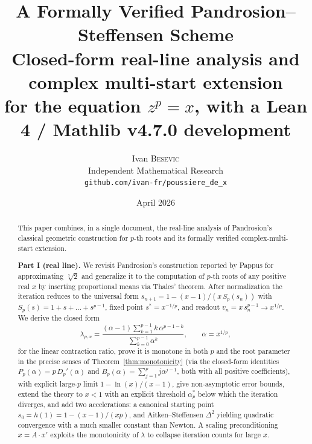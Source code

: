\documentclass[11pt,a4paper]{article}
\title{\textbf{A Formally Verified Pandrosion--Steffensen Scheme}\\[0.3em]
  \large Closed-form real-line analysis and complex multi-start extension\\
  for the equation $z^p = x$, with a Lean 4 / Mathlib v4.7.0 development}
\author{Ivan \textsc{Besevic}\\
\small Independent Mathematical Research\\
\small \texttt{github.com/ivan-fr/poussiere\_de\_x}}
\date{April 2026}
\theoremstyle{definition}
\newcommand{\cbrt}[1]{\sqrt[3]{#1}}
\begin{document}
\maketitle

\begin{abstract}
This paper combines, in a single document, the real-line analysis of
Pandrosion's classical geometric construction for $p$-th roots and its
formally verified complex-multi-start extension.

\medskip

\textbf{Part I (real line).} We revisit Pandrosion's construction
reported by Pappus for approximating $\cbrt{2}$ and generalize it to
the computation of $p$-th roots of any positive real $x$ by inserting
proportional means via Thales' theorem. After normalization the
iteration reduces to the universal form
$s_{n+1} = 1 - (x-1)/(x\,S_p(s_n))$ with
$S_p(s) = 1 + s + \dots + s^{p-1}$, fixed point $s^* = x^{-1/p}$, and
readout $v_n = x\,s_n^{p-1} \to x^{1/p}$. We derive the closed form
\[
  \lambda_{p,x}
  = \frac{(\alpha - 1)\sum_{k=1}^{p-1} k\,\alpha^{p-1-k}}
         {\sum_{k=0}^{p-1} \alpha^k},
  \qquad \alpha = x^{1/p},
\]
for the linear contraction ratio, prove it is monotone in both $p$
and the root parameter in the precise senses of Theorem~\ref{thm:monotonicity}
(via the closed-form identities $P_p(\alpha) = p\,D_p'(\alpha)$ and $B_p(\alpha) = \sum_{j=1}^{p} j\alpha^{j-1}$, both with all positive coefficients), with explicit large-$p$ limit $1 - \ln(x)/(x-1)$, give
non-asymptotic error bounds, extend the theory to $x < 1$ with an
explicit threshold $\alpha^*_p$ below which the iteration diverges,
and add two accelerations: a canonical starting point
$s_0 = h(1) = 1 - (x-1)/(xp)$, and Aitken--Steffensen $\Delta^2$
yielding quadratic convergence with a much smaller constant than
Newton. A scaling preconditioning $x = A \cdot x'$ exploits the
monotonicity of $\lambda$ to collapse iteration counts for large $x$.

\medskip


\end{abstract}
\end{document}
